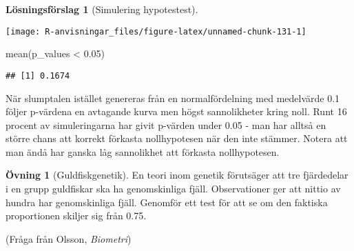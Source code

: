 \documentclass[
]{book}
\newenvironment{Shaded}{\begin{snugshade}}{\end{snugshade}}
\newcommand{\AttributeTok}[1]{\textcolor[rgb]{0.77,0.63,0.00}{#1}}
\newcommand{\ControlFlowTok}[1]{\textcolor[rgb]{0.13,0.29,0.53}{\textbf{#1}}}
\newcommand{\DecValTok}[1]{\textcolor[rgb]{0.00,0.00,0.81}{#1}}
\newcommand{\FloatTok}[1]{\textcolor[rgb]{0.00,0.00,0.81}{#1}}
\newcommand{\FunctionTok}[1]{\textcolor[rgb]{0.00,0.00,0.00}{#1}}
\newcommand{\NormalTok}[1]{#1}
\newcommand{\OtherTok}[1]{\textcolor[rgb]{0.56,0.35,0.01}{#1}}
\newcommand{\SpecialCharTok}[1]{\textcolor[rgb]{0.00,0.00,0.00}{#1}}
\theoremstyle{definition}
\theoremstyle{definition}
\theoremstyle{definition}
\newtheorem{exercise}{Övning}[chapter]
\theoremstyle{definition}
\newtheorem{hypothesis}{Lösningsförslag}[chapter]
\theoremstyle{remark}
\begin{document}
\begin{hypothesis}[Simulering hypotestest]
\begin{Shaded}
\end{Shaded}

\begin{center}\texttt{[image: R-anvisningar\_files/figure-latex/unnamed-chunk-131-1]} \end{center}

\begin{Shaded}
\begin{Highlighting}[]
\FunctionTok{mean}\NormalTok{(p\_values }\SpecialCharTok{\textless{}} \FloatTok{0.05}\NormalTok{)}
\end{Highlighting}
\end{Shaded}

\begin{verbatim}
## [1] 0.1674
\end{verbatim}

När slumptalen istället genereras från en normalfördelning med medelvärde 0.1 följer p-värdena en avtagande kurva men högst sannolikheter kring noll. Runt 16 procent av simuleringarna har givit p-värden under 0.05 - man har alltså en större chans att korrekt förkasta nollhypotesen när den inte stämmer. Notera att man ändå har ganska låg sannolikhet att förkasta nollhypotesen.
\end{hypothesis}

\begin{exercise}[Guldfiskgenetik]
En teori inom genetik förutsäger att tre fjärdedelar i en grupp guldfiskar ska ha genomskinliga fjäll. Observationer ger att nittio av hundra har genomskinliga fjäll. Genomför ett test för att se om den faktiska proportionen skiljer sig från 0.75.

(Fråga från Olsson, \emph{Biometri})
\end{exercise}
\end{document}
